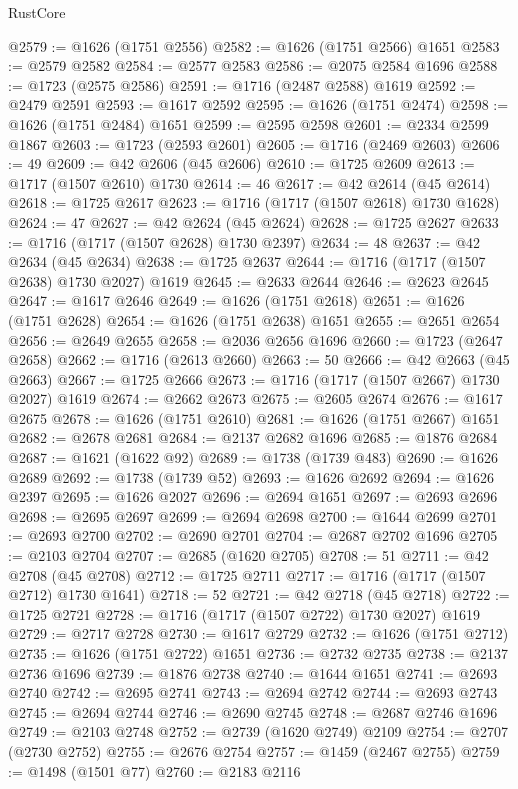 \begin{lexlean}{RustCore}
\begin{coremodule}
@2579 := @1626 (@1751 @2556)
@2582 := @1626 (@1751 @2566) @1651
@2583 := @2579 @2582
@2584 := @2577 @2583
@2586 := @2075 @2584 @1696
@2588 := @1723 (@2575 @2586)
@2591 := @1716 (@2487 @2588) @1619
@2592 := @2479 @2591
@2593 := @1617 @2592
@2595 := @1626 (@1751 @2474)
@2598 := @1626 (@1751 @2484) @1651
@2599 := @2595 @2598
@2601 := @2334 @2599 @1867
@2603 := @1723 (@2593 @2601)
@2605 := @1716 (@2469 @2603)
@2606 := 49
@2609 := @42 @2606 (@45 @2606)
@2610 := @1725 @2609
@2613 := @1717 (@1507 @2610) @1730
@2614 := 46
@2617 := @42 @2614 (@45 @2614)
@2618 := @1725 @2617
@2623 := @1716 (@1717 (@1507 @2618) @1730 @1628)
@2624 := 47
@2627 := @42 @2624 (@45 @2624)
@2628 := @1725 @2627
@2633 := @1716 (@1717 (@1507 @2628) @1730 @2397)
@2634 := 48
@2637 := @42 @2634 (@45 @2634)
@2638 := @1725 @2637
@2644 := @1716 (@1717 (@1507 @2638) @1730 @2027) @1619
@2645 := @2633 @2644
@2646 := @2623 @2645
@2647 := @1617 @2646
@2649 := @1626 (@1751 @2618)
@2651 := @1626 (@1751 @2628)
@2654 := @1626 (@1751 @2638) @1651
@2655 := @2651 @2654
@2656 := @2649 @2655
@2658 := @2036 @2656 @1696
@2660 := @1723 (@2647 @2658)
@2662 := @1716 (@2613 @2660)
@2663 := 50
@2666 := @42 @2663 (@45 @2663)
@2667 := @1725 @2666
@2673 := @1716 (@1717 (@1507 @2667) @1730 @2027) @1619
@2674 := @2662 @2673
@2675 := @2605 @2674
@2676 := @1617 @2675
@2678 := @1626 (@1751 @2610)
@2681 := @1626 (@1751 @2667) @1651
@2682 := @2678 @2681
@2684 := @2137 @2682 @1696
@2685 := @1876 @2684
@2687 := @1621 (@1622 @92)
@2689 := @1738 (@1739 @483)
@2690 := @1626 @2689
@2692 := @1738 (@1739 @52)
@2693 := @1626 @2692
@2694 := @1626 @2397
@2695 := @1626 @2027
@2696 := @2694 @1651
@2697 := @2693 @2696
@2698 := @2695 @2697
@2699 := @2694 @2698
@2700 := @1644 @2699
@2701 := @2693 @2700
@2702 := @2690 @2701
@2704 := @2687 @2702 @1696
@2705 := @2103 @2704
@2707 := @2685 (@1620 @2705)
@2708 := 51
@2711 := @42 @2708 (@45 @2708)
@2712 := @1725 @2711
@2717 := @1716 (@1717 (@1507 @2712) @1730 @1641)
@2718 := 52
@2721 := @42 @2718 (@45 @2718)
@2722 := @1725 @2721
@2728 := @1716 (@1717 (@1507 @2722) @1730 @2027) @1619
@2729 := @2717 @2728
@2730 := @1617 @2729
@2732 := @1626 (@1751 @2712)
@2735 := @1626 (@1751 @2722) @1651
@2736 := @2732 @2735
@2738 := @2137 @2736 @1696
@2739 := @1876 @2738
@2740 := @1644 @1651
@2741 := @2693 @2740
@2742 := @2695 @2741
@2743 := @2694 @2742
@2744 := @2693 @2743
@2745 := @2694 @2744
@2746 := @2690 @2745
@2748 := @2687 @2746 @1696
@2749 := @2103 @2748
@2752 := @2739 (@1620 @2749) @2109
@2754 := @2707 (@2730 @2752)
@2755 := @2676 @2754
@2757 := @1459 (@2467 @2755)
@2759 := @1498 (@1501 @77)
@2760 := @2183 @2116

\end{coremodule}
\end{lexlean}
